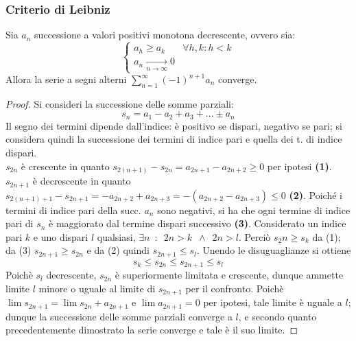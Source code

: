 \documentclass[10pt]{article}
\theoremstyle{plain}
\begin{document}
\subsubsection{Criterio di Leibniz}
\hypertarget{leibniz}{
\begin{ther}
Sia $a_n$ successione a valori positivi monotona decrescente, ovvero sia:
\begin{equation*}
    \begin{cases}
    a_{h} \geq a_{k} & \forall h, k : h < k\\
    a_n \xrightarrow[n \rightarrow \infty]{} 0
    \end{cases}
\end{equation*}
Allora la serie a segni alterni $\displaystyle \sum_{n=1}^{\infty} (-1)^{n+1} a_n$ converge.
\end{ther}
}
\begin{proof}
Si consideri la successione delle somme parziali:
\[s_n = a_1 - a_2 + a_3 + ... \pm a_n\]
Il segno dei termini dipende dall'indice: è positivo se dispari, negativo se pari; si considera quindi la successione dei termini di indice pari e quella dei t. di indice dispari.
\\$s_{2n}$ è crescente in quanto $s_{2(n+1)} - s_{2n} = a_{2n+1} - a_{2n+2} \geq 0$ per ipotesi \textbf{(1)}.
\\$s_{2n+1}$ è decrescente in quanto $s_{2(n+1)+1} - s_{2n+1} = - a_{2n+2} + a_{2n+3} = - (a_{2n+2} - a_{2n+3}) \leq 0$ \textbf{(2)}. Poiché i termini di indice pari della succ. $a_n$ sono negativi, si ha che ogni termine di indice pari di $s_n$ è maggiorato dal termine dispari successivo \textbf{(3)}. Considerato un indice pari $k$ e uno dispari $l$ qualsiasi, $\exists n \enspace : \enspace 2n > k \enspace \land \enspace 2n > l$. Perciò $s_2n \geq s_k$ da (1); da (3) $s_{2n+1} \geq s_{2n}$ e da (2) quindi $s_{2n+1} \leq s_l$. Unendo le disuguaglianze si ottiene
\[s_k \leq s_{2n} \leq s_{2n+1} \leq s_l\]
Poichè $s_l$ decrescente, $s_{2n}$ è superiormente limitata e crescente, dunque ammette limite $l$ minore o uguale al limite di $s_{2n+1}$ per il confronto. Poichè $\lim s_{2n+1} = \lim s_{2n} + a_{2n+1}$ e $\lim a_{2n+1} = 0$ per ipotesi, tale limite è uguale a $l$; dunque la successione delle somme parziali converge a $l$, e secondo quanto precedentemente dimostrato la serie converge e tale è il suo limite.
\end{proof}
\end{document}
